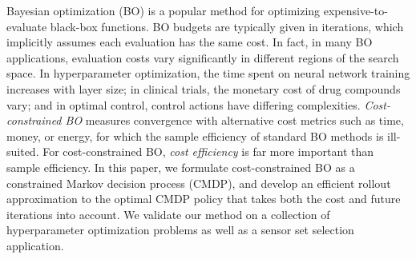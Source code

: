 Bayesian optimization (BO) is a popular method for optimizing expensive-to-evaluate black-box functions.
BO budgets are typically given in iterations, which implicitly assumes each evaluation has the same cost. 
In fact, in many BO applications, evaluation costs vary significantly in different regions of the search space.
In hyperparameter optimization, the time spent on neural network training increases with layer size; in clinical trials, the monetary cost of drug compounds vary; and in optimal control, control actions have differing complexities. 
\textit{Cost-constrained BO} measures convergence with alternative cost metrics such as time, money, or energy, for which the sample efficiency of standard BO methods is ill-suited. 
For cost-constrained BO, \textit{cost efficiency} is far more important than sample efficiency. 
In this paper, we formulate cost-constrained BO as a constrained Markov decision process (CMDP), and develop an efficient rollout approximation to the optimal CMDP policy that takes both the cost and future iterations into account. 
We validate our method on a collection of hyperparameter optimization problems as well as a sensor set selection application.